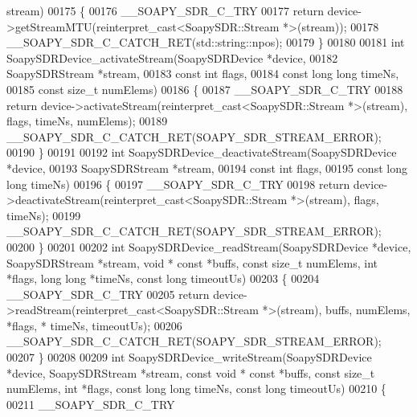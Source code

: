\begin{DoxyCode}
      stream)
00175 \{
00176     __SOAPY_SDR_C_TRY
00177     \textcolor{keywordflow}{return} device->getStreamMTU(reinterpret\_cast<SoapySDR::Stream *>(stream));
00178     __SOAPY_SDR_C_CATCH_RET(std::string::npos);
00179 \}
00180 
00181 \textcolor{keywordtype}{int} SoapySDRDevice_activateStream(SoapySDRDevice *device,
00182     SoapySDRStream *stream,
00183     \textcolor{keyword}{const} \textcolor{keywordtype}{int} flags,
00184     \textcolor{keyword}{const} \textcolor{keywordtype}{long} \textcolor{keywordtype}{long} timeNs,
00185     \textcolor{keyword}{const} \textcolor{keywordtype}{size\_t} numElems)
00186 \{
00187     __SOAPY_SDR_C_TRY
00188     \textcolor{keywordflow}{return} device->activateStream(reinterpret\_cast<SoapySDR::Stream *>(stream), flags, timeNs, numElems);
00189     __SOAPY_SDR_C_CATCH_RET(SOAPY_SDR_STREAM_ERROR);
00190 \}
00191 
00192 \textcolor{keywordtype}{int} SoapySDRDevice_deactivateStream(SoapySDRDevice *device,
00193     SoapySDRStream *stream,
00194     \textcolor{keyword}{const} \textcolor{keywordtype}{int} flags,
00195     \textcolor{keyword}{const} \textcolor{keywordtype}{long} \textcolor{keywordtype}{long} timeNs)
00196 \{
00197     __SOAPY_SDR_C_TRY
00198     \textcolor{keywordflow}{return} device->deactivateStream(reinterpret\_cast<SoapySDR::Stream *>(stream), flags, timeNs);
00199     __SOAPY_SDR_C_CATCH_RET(SOAPY_SDR_STREAM_ERROR);
00200 \}
00201 
00202 \textcolor{keywordtype}{int} SoapySDRDevice_readStream(SoapySDRDevice *device, SoapySDRStream *stream, \textcolor{keywordtype}{void} * \textcolor{keyword}{const} *buffs, \textcolor{keyword}{const} \textcolor{keywordtype}{
      size\_t} numElems, \textcolor{keywordtype}{int} *flags, \textcolor{keywordtype}{long} \textcolor{keywordtype}{long} *timeNs, \textcolor{keyword}{const} \textcolor{keywordtype}{long} timeoutUs)
00203 \{
00204     __SOAPY_SDR_C_TRY
00205     \textcolor{keywordflow}{return} device->readStream(reinterpret\_cast<SoapySDR::Stream *>(stream), buffs, numElems, *flags, *
      timeNs, timeoutUs);
00206     __SOAPY_SDR_C_CATCH_RET(SOAPY_SDR_STREAM_ERROR);
00207 \}
00208 
00209 \textcolor{keywordtype}{int} SoapySDRDevice_writeStream(SoapySDRDevice *device, SoapySDRStream *stream, \textcolor{keyword}{const} \textcolor{keywordtype}{void} * \textcolor{keyword}{const} *buffs, \textcolor{keyword}{
      const} \textcolor{keywordtype}{size\_t} numElems, \textcolor{keywordtype}{int} *flags, \textcolor{keyword}{const} \textcolor{keywordtype}{long} \textcolor{keywordtype}{long} timeNs, \textcolor{keyword}{const} \textcolor{keywordtype}{long} timeoutUs)
00210 \{
00211     __SOAPY_SDR_C_TRY

\end{DoxyCode}
